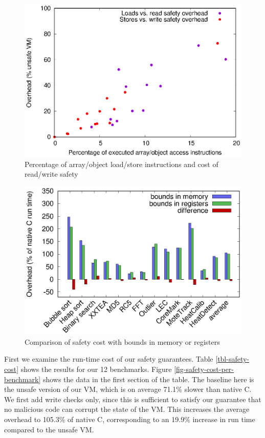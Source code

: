 \begin{figure}
\centering
\includegraphics[width=\mygraphsize]{safety-ld-st-percentage-vs-overhead.eps}
\caption{Percentage of array/object load/store instructions and cost of read/write safety}
\label{fig-safety-ld-st-percentage-vs-overhead}
\end{figure}

\begin{figure}
\centering
\includegraphics[width=\mygraphsize]{safety-cost-diff-using-regs.eps}
\caption{Comparison of safety cost with bounds in memory or registers}
\label{fig-safety-cost-memory-or-registers}
\end{figure}

First we examine the run-time cost of our safety guarantees. Table \ref{tbl-safety-cost} shows the results for our 12 benchmarks. Figure \ref{fig-safety-cost-per-benchmark} shows the data in the first section of the table. The baseline here is the unsafe version of our VM, which is on average 71.1\% slower than native C. We first add write checks only, since this is sufficient to satisfy our guarantee that no malicious code can corrupt the state of the VM. This increases the average overhead to 105.3\% of native C, corresponding to an 19.9\% increase in run time compared to the unsafe VM.

